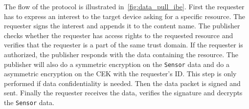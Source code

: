 The flow of the protocol is illustrated in~\autoref{fig:data_pull_ibe}.
First the \gls{requester} has to express an \gls{interest} to the target device asking for a specific resource. 
The \gls{requester} signs the \gls{interest} and appends it to the content \gls{name}.
The \gls{publisher} checks whether the \gls{requester} has access rights to the requested resource and verifies that the \gls{requester} is a part of the same trust domain.
If the \gls{requester} is authorized, the \gls{publisher} responds with the \gls{data} containing the resource. 
The \gls{publisher} will also do a symmetric encryption on the \texttt{Sensor} \gls{data} and do a asymmetric encryption on the \gls{CEK} with the requester's \gls{ID}.
This step is only performed if \gls{data} confidentiality is needed. 
Then the \gls{data} packet is signed and sent.
Finally the \gls{requester} receives the \gls{data}, verifies the signature and decrypts the \texttt{Sensor} \gls{data}.

